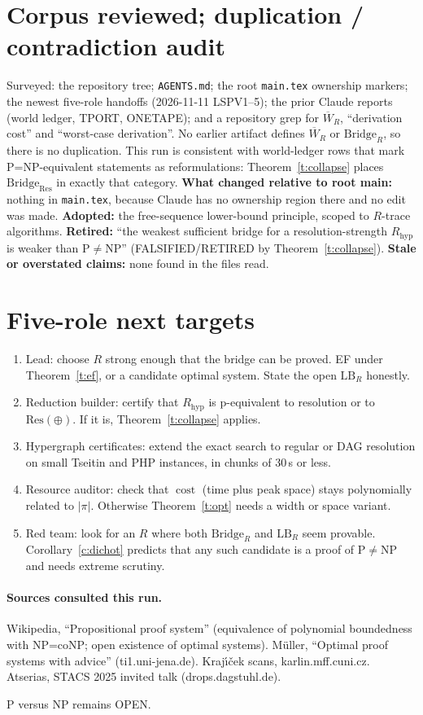 \documentclass[11pt]{article}
\theoremstyle{definition}
\begin{document}
\section{Corpus reviewed; duplication / contradiction audit}
Surveyed: the repository tree; \texttt{AGENTS.md}; the root \texttt{main.tex} ownership markers;
the newest five-role handoffs (2026-11-11 LSPV1--5); the prior Claude reports (world ledger,
TPORT, ONETAPE); and a repository grep for $\overline W_R$, ``derivation cost'' and
``worst-case derivation''. No earlier artifact defines $\overline W_R$ or $\mathrm{Bridge}_R$,
so there is no duplication. This run is consistent with world-ledger rows that mark
P=NP-equivalent statements as reformulations: Theorem~\ref{t:collapse} places
$\mathrm{Bridge}_{\mathrm{Res}}$ in exactly that category.
\textbf{What changed relative to root main:} nothing in \texttt{main.tex}, because Claude has
no ownership region there and no edit was made.
\textbf{Adopted:} the free-sequence lower-bound principle, scoped to $R$-trace algorithms.
\textbf{Retired:} ``the weakest sufficient bridge for a resolution-strength $R_{\mathrm{hyp}}$
is weaker than P$\ne$NP'' (FALSIFIED/RETIRED by Theorem~\ref{t:collapse}).
\textbf{Stale or overstated claims:} none found in the files read.

\section{Five-role next targets}
\begin{enumerate}
\item Lead: choose $R$ strong enough that the bridge can be proved. EF under
Theorem~\ref{t:ef}, or a candidate optimal system. State the open $\mathrm{LB}_R$ honestly.
\item Reduction builder: certify that $R_{\mathrm{hyp}}$ is p-equivalent to resolution or to
$\mathrm{Res}(\oplus)$. If it is, Theorem~\ref{t:collapse} applies.
\item Hypergraph certificates: extend the exact search to regular or DAG resolution on small
Tseitin and PHP instances, in chunks of 30\,s or less.
\item Resource auditor: check that $\operatorname{cost}$ (time plus peak space) stays
polynomially related to $|\pi|$. Otherwise Theorem~\ref{t:opt} needs a width or space variant.
\item Red team: look for an $R$ where both $\mathrm{Bridge}_R$ and $\mathrm{LB}_R$ seem provable.
Corollary~\ref{c:dichot} predicts that any such candidate is a proof of P$\ne$NP and needs
extreme scrutiny.
\end{enumerate}

\paragraph{Sources consulted this run.} Wikipedia, ``Propositional proof system'' (equivalence
of polynomial boundedness with NP=coNP; open existence of optimal systems).
M\"uller, ``Optimal proof systems with advice'' (ti1.uni-jena.de).
Kraj\'{\i}\v{c}ek scans, karlin.mff.cuni.cz.
Atserias, STACS 2025 invited talk (drops.dagstuhl.de).

P versus NP remains OPEN.
\end{document}
